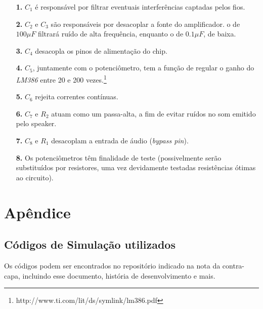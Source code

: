\documentclass[11pt,a4paper]{report}
\begin{document}
\begin{itemize}
	\item[{\bf 1.}]$C_1$ é responsável por filtrar eventuais interferências captadas pelos fios.
	\item[{\bf 2.}]$C_2$ e $C_3$ são responsáveis por desacoplar a fonte do amplificador. o de $100\mu{F}$ filtrará ruído de alta frequência, enquanto o de $0.1\mu{F}$, de baixa.
	\item[{\bf 3.}]$C_4$ desacopla os pinos de alimentação do chip.
	\item[{\bf 4.}]$C_5$, juntamente com o potenciômetro, tem a função de regular o ganho do {\it LM386} entre 20 e 200 vezes.\footnote{http://www.ti.com/lit/ds/symlink/lm386.pdf}
	\item[{\bf 5.}]$C_6$ rejeita correntes contínuas.
	\item[{\bf 6.}]$C_7$ e $R_2$ atuam como um passa-alta, a fim de evitar ruídos no som emitido pelo speaker.
	\item[{\bf 7.}]$C_8$ e $R_1$ desacoplam a entrada de áudio ({\it bypass pin}).
	\item[{\bf 8.}]Os potenciômetros têm finalidade de teste (possivelmente serão substituídos por resistores, uma vez devidamente testadas resistências ótimas ao circuito).
\end{itemize}
\newpage
	
\chapter{Apêndice}
\section{Códigos de Simulação utilizados}
Os códigos podem ser encontrados no repositório indicado na nota da contra-capa, incluindo esse documento, história de desenvolvimento e mais.
\end{document}
